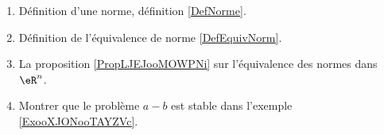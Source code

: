 
    \begin{enumerate}
        \item
            Définition d'une norme, définition \ref{DefNorme}.
        \item
            Définition de l'équivalence de norme \ref{DefEquivNorm}.
\item
    La proposition \ref{PropLJEJooMOWPNi} sur l'équivalence des normes dans \( \eR^n\).
\item
    Montrer que le problème \( a-b\) est stable dans l'exemple \ref{ExooXJONooTAYZVc}.
\end{enumerate}

